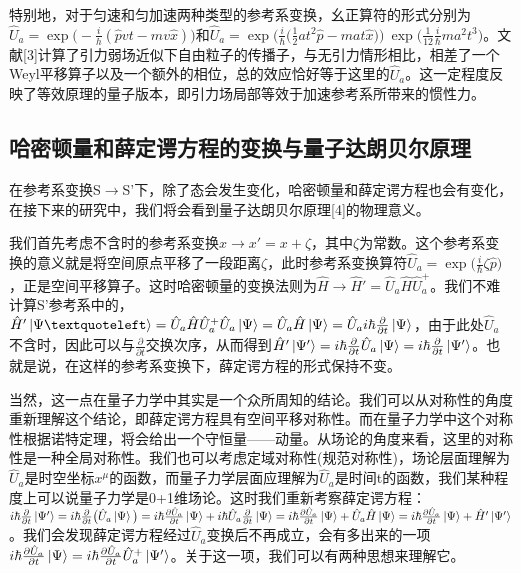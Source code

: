 \documentclass[a4paper]{article}
\begin{document}
        特别地，对于匀速和匀加速两种类型的参考系变换，幺正算符的形式分别为$\hat{U}_a=\exp\big(-\frac{i}{h}(\hat{p}vt-mv\hat{x})\big)$和$\hat{U}_a=\exp\big(\frac{i}{\hbar}\big(\frac{1}{2}at^2\hat{p}-mat\hat{x} \big)\big)\ \exp\big(\frac{1}{12}\frac{i}{\hbar}ma^2t^3\big)$。文献[3]计算了引力弱场近似下自由粒子的传播子，与无引力情形相比，相差了一个Weyl平移算子以及一个额外的相位，总的效应恰好等于这里的$\hat{U}_a$。这一定程度反映了等效原理的量子版本，即引力场局部等效于加速参考系所带来的惯性力。

        \subsection{哈密顿量和薛定谔方程的变换与量子达朗贝尔原理}

            在参考系变换S$\rightarrow$S'下，除了态会发生变化，哈密顿量和薛定谔方程也会有变化，在接下来的研究中，我们将会看到量子达朗贝尔原理[4]的物理意义。

            我们首先考虑不含时的参考系变换$x\rightarrow x'=x+\zeta$，其中$\zeta$为常数。这个参考系变换的意义就是将空间原点平移了一段距离$\zeta$，此时参考系变换算符$\hat{U}_a=\exp\big(\frac{i}{\hbar}\zeta\hat{p} \big)$，正是空间平移算子。这时哈密顿量的变换法则为$\hat{H}\rightarrow \hat{H}'=\hat{U}_a\hat{H}\hat{U}_a^+$。我们不难计算S'参考系中的，$\hat{H}'\ket{\Psi‘}=\hat{U}_a\hat{H}\hat{U}_a^+\hat{U}_a\ket{\Psi}=\hat{U}_a\hat{H}\ket{\Psi}=\hat{U}_a i\hbar\frac{\partial}{\partial t}\ket{\Psi}$，由于此处$\hat{U}_a$不含时，因此可以与$\frac{\partial}{\partial t}$交换次序，从而得到$\hat{H}'\ket{\Psi'}=i\hbar\frac{\partial}{\partial t}\hat{U}_a\ket{\Psi}=i\hbar\frac{\partial}{\partial t}\ket{\Psi'}$。也就是说，在这样的参考系变换下，薛定谔方程的形式保持不变。

            当然，这一点在量子力学中其实是一个众所周知的结论。我们可以从对称性的角度重新理解这个结论，即薛定谔方程具有空间平移对称性。而在量子力学中这个对称性根据诺特定理，将会给出一个守恒量——动量。从场论的角度来看，这里的对称性是一种全局对称性。我们也可以考虑定域对称性(规范对称性)，场论层面理解为$\hat{U}_a$是时空坐标$x^\mu$的函数，而量子力学层面应理解为$\hat{U}_a$是时间t的函数，我们某种程度上可以说量子力学是0+1维场论。这时我们重新考察薛定谔方程：$i\hbar\frac{\partial}{\partial t}\ket{\Psi'} = i\hbar\frac{\partial}{\partial t}\big(\hat{U}_a\ket{\Psi}\big) = i\hbar\frac{\partial\hat{U}_a}{\partial t}\ket{\Psi} + i\hbar\hat{U}_a\frac{\partial}{\partial t}\ket{\Psi} = i\hbar\frac{\partial\hat{U}_a}{\partial t}\ket{\Psi} + \hat{U}_a\hat{H}\ket{\Psi} = i\hbar\frac{\partial\hat{U}_a}{\partial t}\ket{\Psi} + \hat{H}'\ket{\Psi'}$。我们会发现薛定谔方程经过$\hat{U}_a$变换后不再成立，会有多出来的一项$i\hbar\frac{\partial\hat{U}_a}{\partial t}\ket{\Psi} = i\hbar\frac{\partial\hat{U}_a}{\partial t}\hat{U}_a^+\ket{\Psi'}$。关于这一项，我们可以有两种思想来理解它。
\end{document}
